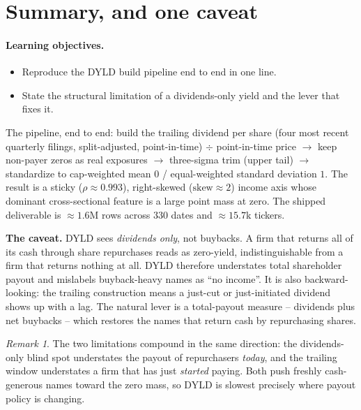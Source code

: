 \documentclass[11pt]{article}
\theoremstyle{definition}
\theoremstyle{plain}
\theoremstyle{remark}
\newtheorem*{remark}{Remark}
\begin{document}
\section{Summary, and one caveat}\label{sec:summary}

\paragraph{Learning objectives.}
\begin{itemize}[leftmargin=1.4em,topsep=2pt]
  \item Reproduce the DYLD build pipeline end to end in one line.
  \item State the structural limitation of a dividends-only yield and the lever that fixes it.
\end{itemize}

The pipeline, end to end: build the trailing dividend per share (four most recent quarterly filings, split-adjusted, point-in-time) $\div$ point-in-time price $\to$ keep non-payer zeros as real exposures $\to$ three-sigma trim (upper tail) $\to$ standardize to cap-weighted mean $0$ / equal-weighted standard deviation $1$. The result is a sticky ($\rho \approx 0.993$), right-skewed ($\text{skew} \approx 2$) income axis whose dominant cross-sectional feature is a large point mass at zero. The shipped deliverable is $\approx 1.6$M rows across $330$ dates and $\approx 15.7$k tickers.

\begin{pitfall}
\textbf{The caveat.} DYLD sees \emph{dividends only}, not buybacks. A firm that returns all of its cash through share repurchases reads as zero-yield, indistinguishable from a firm that returns nothing at all. DYLD therefore understates total shareholder payout and mislabels buyback-heavy names as ``no income''. It is also backward-looking: the trailing construction means a just-cut or just-initiated dividend shows up with a lag. The natural lever is a total-payout measure -- dividends plus net buybacks -- which restores the names that return cash by repurchasing shares.
\end{pitfall}

\begin{remark}
The two limitations compound in the same direction: the dividends-only blind spot understates the payout of repurchasers \emph{today}, and the trailing window understates a firm that has just \emph{started} paying. Both push freshly cash-generous names toward the zero mass, so DYLD is slowest precisely where payout policy is changing.
\end{remark}
\end{document}
